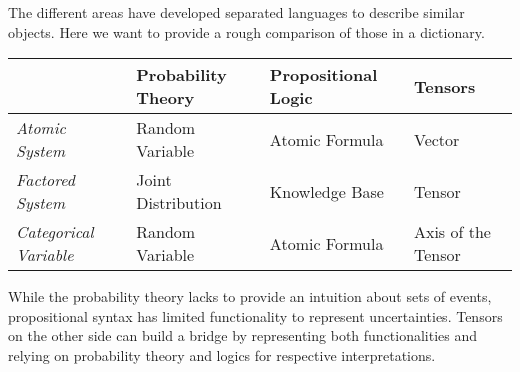 The different areas have developed separated languages to describe similar objects.
Here we want to provide a rough comparison of those in a dictionary.

\begin{tabular}{|p{\fourcolumnwidth}|p{\fourcolumnwidth}|p{\fourcolumnwidth}|p{\fourcolumnwidth}|}
    \hline
    & \textbf{Probability Theory} & \textbf{Propositional Logic} & \textbf{Tensors}   \\
    \hline
    \textit{Atomic System}        & Random Variable             & Atomic Formula               & Vector             \\
    \textit{Factored System}      & Joint Distribution          & Knowledge Base               & Tensor             \\
    \textit{Categorical Variable} & Random Variable             & Atomic Formula               & Axis of the Tensor \\
    \hline
\end{tabular}

While the probability theory lacks to provide an intuition about sets of events, propositional syntax has limited functionality to represent uncertainties.
Tensors on the other side can build a bridge by representing both functionalities and relying on probability theory and logics for respective interpretations.

